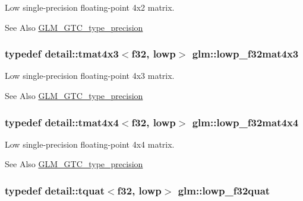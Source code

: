 Low single-\/precision floating-\/point 4x2 matrix. \begin{DoxySeeAlso}{See Also}
\hyperlink{group__gtc__type__precision}{G\-L\-M\-\_\-\-G\-T\-C\-\_\-type\-\_\-precision} 
\end{DoxySeeAlso}
\hypertarget{group__gtc__type__precision_gadd0ff5b09c6ecac83e4e908e3f6478c7}{
\subsubsection[{lowp\-\_\-f32mat4x3}]{\setlength{\rightskip}{0pt plus 5cm}typedef detail\-::tmat4x3$<$f32, lowp$>$ {\bf glm\-::lowp\-\_\-f32mat4x3}}}\label{group__gtc__type__precision_gadd0ff5b09c6ecac83e4e908e3f6478c7}
Low single-\/precision floating-\/point 4x3 matrix. \begin{DoxySeeAlso}{See Also}
\hyperlink{group__gtc__type__precision}{G\-L\-M\-\_\-\-G\-T\-C\-\_\-type\-\_\-precision} 
\end{DoxySeeAlso}
\hypertarget{group__gtc__type__precision_gab7a6454e1f5d5c434ff316b139eb0231}{
\subsubsection[{lowp\-\_\-f32mat4x4}]{\setlength{\rightskip}{0pt plus 5cm}typedef detail\-::tmat4x4$<$f32, lowp$>$ {\bf glm\-::lowp\-\_\-f32mat4x4}}}\label{group__gtc__type__precision_gab7a6454e1f5d5c434ff316b139eb0231}
Low single-\/precision floating-\/point 4x4 matrix. \begin{DoxySeeAlso}{See Also}
\hyperlink{group__gtc__type__precision}{G\-L\-M\-\_\-\-G\-T\-C\-\_\-type\-\_\-precision} 
\end{DoxySeeAlso}
\hypertarget{group__gtc__type__precision_ga83edc5f21bfa41f72f881b29aabbd919}{
\subsubsection[{lowp\-\_\-f32quat}]{\setlength{\rightskip}{0pt plus 5cm}typedef detail\-::tquat$<$f32, lowp$>$ {\bf glm\-::lowp\-\_\-f32quat}}}\label{group__gtc__type__precision_ga83edc5f21bfa41f72f881b29aabbd919}
